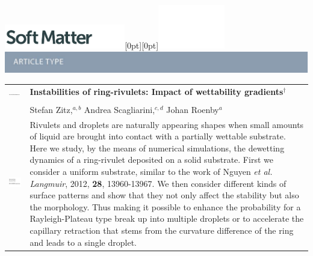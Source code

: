 \documentclass[twoside,twocolumn,9pt]{article}
\begin{document}
  \begin{@twocolumnfalse}
{\includegraphics[height=30pt]{head_foot/SM}\hfill\raisebox{0pt}[0pt][0pt]{\includegraphics[height=55pt]{head_foot/RSC_LOGO_CMYK}}\\[1ex]
\includegraphics[width=18.5cm]{head_foot/header_bar}}\par
\vspace{1em}
\sffamily
\begin{tabular}{m{4.5cm} p{13.5cm} }

\includegraphics{head_foot/DOI} & \noindent\LARGE{\textbf{Instabilities of ring-rivulets: Impact of wettability gradients$^\dag$}} \\%
\vspace{0.3cm} & \vspace{0.3cm} \\

 & \noindent\large{Stefan Zitz,\textit{$^{a,b}$} Andrea Scagliarini,\textit{$^{c,d}$} Johan Roenby\textit{$^{a}$}} \\%

\includegraphics{head_foot/dates} & \noindent\normalsize{
Rivulets and droplets are naturally appearing shapes when small amounts of liquid are brought into contact with a partially wettable substrate.
Here we study, by the means of numerical simulations, the dewetting dynamics of a ring-rivulet deposited on a solid substrate.
First we consider a uniform substrate, similar to the work of Nguyen \textit{et al. Langmuir}, 2012, \textbf{28}, 13960-13967.
We then consider different kinds of surface patterns and show that they not only affect the stability but also the morphology.
Thus making it possible to enhance the probability for a Rayleigh-Plateau type break up into multiple droplets or to accelerate the capillary retraction that stems from the curvature difference of the ring and leads to a single droplet.
}


\end{tabular}
\end{@twocolumnfalse}
\end{document}
